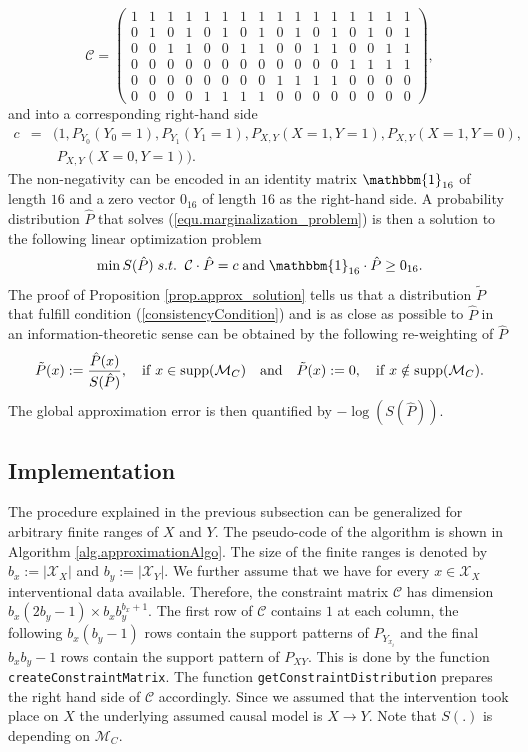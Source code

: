 \documentclass[letterpaper]{article}
\newcommand{\kC}{\mathcal{C}}   %
\newcommand{\kM}{\mathcal{M}}   %
\newcommand{\kX}{\mathcal{X}}   %
\newcommand{\Ind}{\mathbbm{1}} %
\newcommand{\code}[1]{\texttt{#1}}
\newcommand{\supp}{{\rm supp}}
\begin{document}
$$\kC =
\begin{pmatrix}
1 & 1 & 1 & 1 & 1 & 1 & 1 & 1 & 1 & 1 & 1 & 1 & 1 & 1 & 1 & 1 \\
0 & 1 & 0 & 1 & 0 & 1 & 0 & 1 & 0 & 1 & 0 & 1 & 0 & 1 & 0 & 1 \\
0 & 0 & 1 & 1 & 0 & 0 & 1 & 1 & 0 & 0 & 1 & 1 & 0 & 0 & 1 & 1 \\
0 & 0 & 0 & 0 & 0 & 0 & 0 & 0 & 0 & 0 & 0 & 0 & 1 & 1 & 1 & 1 \\
0 & 0 & 0 & 0 & 0 & 0 & 0 & 0 & 1 & 1 & 1 & 1 & 0 & 0 & 0 & 0 \\
0 & 0 & 0 & 0 & 1 & 1 & 1 & 1 & 0 & 0 & 0 & 0 & 0 & 0 & 0 & 0 
\end{pmatrix},
$$
and into a corresponding right-hand side 
\begin{eqnarray*}
c & = &(1, P_{Y_0}(Y_0 = 1), P_{Y_1}(Y_1 = 1), P_{X,Y}(X = 1, Y=1), P_{X,Y}(X = 1, Y=0), \\
& &\; P_{X,Y}(X = 0, Y=1)).
\end{eqnarray*}
The non-negativity can be encoded in an identity matrix $\Ind_{16}$ of length $16$ and a zero vector $0_{16}$ of length $16$ as the right-hand side. A probability distribution $\hat P$ that solves (\ref{equ.marginalization_problem}) is then a solution to the following linear optimization problem
$$
\min S(\hat P) \; s.t. \; \; \kC \cdot \hat P = c \; {\rm and}\; \Ind_{16} \cdot \hat P \ge 0_{16}.
$$
The proof of Proposition \ref{prop.approx_solution} tells us that a distribution $\tilde P$ that fulfill condition (\ref{consistencyCondition}) and is as close as possible to $\hat P$ in an information-theoretic sense can be obtained by the following re-weighting of $\hat P$
$$
\tilde P (x) := \frac{\hat P(x)}{S(\hat P)}, \quad {\rm if}\; x \in \supp(\kM_C) \quad {\rm and}\quad \tilde P(x) := 0, \quad {\rm if}\; x \notin \supp(\kM_C).
$$
The global approximation error is then quantified by $-\log(S(\hat
 P))$.

\subsection{Implementation}

The procedure explained in the previous subsection can be generalized for arbitrary finite ranges of $X$ and $Y$. The pseudo-code of the algorithm is shown in Algorithm \ref{alg.approximationAlgo}. The size of the finite ranges is denoted by $b_x := |\kX_X|$ and $b_y := |\kX_Y|$. We further assume that we have for every $x \in \kX_X$ interventional data available. Therefore, the constraint matrix $\kC$ has dimension $b_x (2b_y -1) \times b_x b_y^{b_x +1}$. The first row of $\kC$ contains $1$ at each column, the following $b_x(b_y-1)$ rows contain the support patterns of $P_{Y_{x_i}}$ and the final $b_x b_y -1$ rows contain the support pattern of $P_{XY}$.
This is done by the function \code{createConstraintMatrix}. The function \code{getConstraintDistribution} prepares the right hand side of $\kC$ accordingly. Since we assumed that the intervention took place on $X$ the underlying assumed causal model is $X \rightarrow Y$. Note that $S(.)$ is depending on $\kM_C$.
\end{document}

